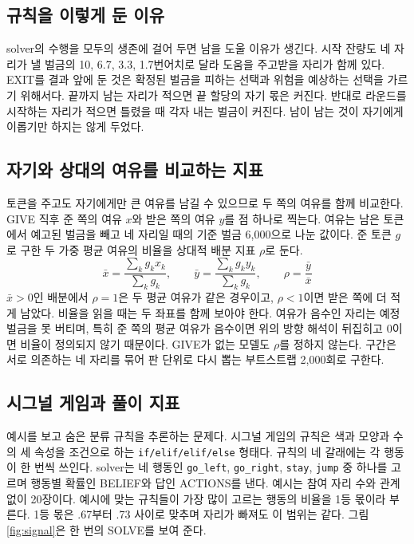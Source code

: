 \subsection{규칙을 이렇게 둔 이유}

solver의 수행을 모두의 생존에 걸어 두면 남을 도울 이유가 생긴다. 시작 잔량도 네 자리가 낼 벌금의 10, 6.7, 3.3, 1.7번어치로 달라 도움을 주고받을 자리가 함께 있다. EXIT를 결과 앞에 둔 것은 확정된 벌금을 피하는 선택과 위험을 예상하는 선택을 가르기 위해서다. 끝까지 남는 자리가 적으면 끝 할당의 자기 몫은 커진다. 반대로 라운드를 시작하는 자리가 적으면 틀렸을 때 각자 내는 벌금이 커진다. 남이 남는 것이 자기에게 이롭기만 하지는 않게 두었다.

\subsection{자기와 상대의 여유를 비교하는 지표}\label{sec:index}

토큰을 주고도 자기에게만 큰 여유를 남길 수 있으므로 두 쪽의 여유를 함께 비교한다. GIVE 직후 준 쪽의 여유 $x$와 받은 쪽의 여유 $y$를 점 하나로 찍는다. 여유는 남은 토큰에서 예고된 벌금을 빼고 네 자리일 때의 기준 벌금 6,000으로 나눈 값이다. 준 토큰 $g$로 구한 두 가중 평균 여유의 비율을 상대적 배분 지표 $\rho$로 둔다.
\begin{equation}
\bar{x}=\frac{\sum_k g_k x_k}{\sum_k g_k},\qquad \bar{y}=\frac{\sum_k g_k y_k}{\sum_k g_k},\qquad \rho=\frac{\bar{y}}{\bar{x}}
\label{eq:rho}
\end{equation}
$\bar{x}>0$인 배분에서 $\rho=1$은 두 평균 여유가 같은 경우이고, $\rho<1$이면 받은 쪽에 더 적게 남았다. 비율을 읽을 때는 두 좌표를 함께 보아야 한다. 여유가 음수인 자리는 예정 벌금을 못 버티며, 특히 준 쪽의 평균 여유가 음수이면 위의 방향 해석이 뒤집히고 0이면 비율이 정의되지 않기 때문이다. GIVE가 없는 모델도 $\rho$를 정하지 않는다. 구간은 서로 의존하는 네 자리를 묶어 판 단위로 다시 뽑는 부트스트랩 2,000회로 구한다.

\subsection{시그널 게임과 풀이 지표}

예시를 보고 숨은 분류 규칙을 추론하는 문제다. 시그널 게임의 규칙은 색과 모양과 수의 세 속성을 조건으로 하는 \texttt{if/elif/elif/else} 형태다. 규칙의 네 갈래에는 각 행동이 한 번씩 쓰인다. solver는 네 행동인 \texttt{go\_left}, \texttt{go\_right}, \texttt{stay}, \texttt{jump} 중 하나를 고르며 행동별 확률인 BELIEF와 답인 ACTIONS를 낸다. 예시는 참여 자리 수와 관계없이 20장이다. 예시에 맞는 규칙들이 가장 많이 고르는 행동의 비율을 1등 몫이라 부른다. 1등 몫은 .67부터 .73 사이로 맞추며 자리가 빠져도 이 범위는 같다. 그림 \ref{fig:signal}은 한 번의 SOLVE를 보여 준다.

